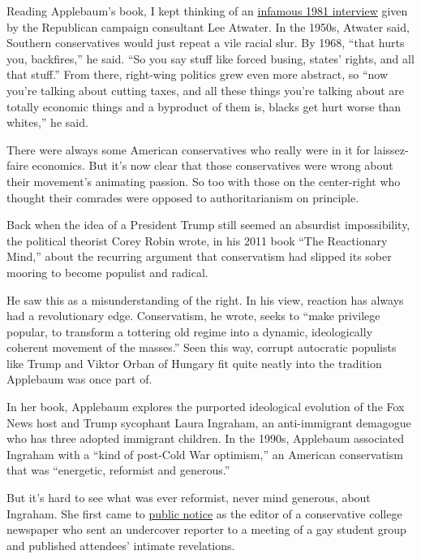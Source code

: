 Reading Applebaum's book, I kept thinking of an
\href{https://www.thenation.com/article/archive/exclusive-lee-atwaters-infamous-1981-interview-southern-strategy/}{infamous
1981 interview} given by the Republican campaign consultant Lee Atwater.
In the 1950s, Atwater said, Southern conservatives would just repeat a
vile racial slur. By 1968, ``that hurts you, backfires,'' he said. ``So
you say stuff like forced busing, states' rights, and all that stuff.''
From there, right-wing politics grew even more abstract, so ``now you're
talking about cutting taxes, and all these things you're talking about
are totally economic things and a byproduct of them is, blacks get hurt
worse than whites,'' he said.

There were always some American conservatives who really were in it for
laissez-faire economics. But it's now clear that those conservatives
were wrong about their movement's animating passion. So too with those
on the center-right who thought their comrades were opposed to
authoritarianism on principle.

Back when the idea of a President Trump still seemed an absurdist
impossibility, the political theorist Corey Robin wrote, in his 2011
book ``The Reactionary Mind,'' about the recurring argument that
conservatism had slipped its sober mooring to become populist and
radical.

He saw this as a misunderstanding of the right. In his view, reaction
has always had a revolutionary edge. Conservatism, he wrote, seeks to
``make privilege popular, to transform a tottering old regime into a
dynamic, ideologically coherent movement of the masses.'' Seen this way,
corrupt autocratic populists like Trump and Viktor Orban of Hungary fit
quite neatly into the tradition Applebaum was once part of.

In her book, Applebaum explores the purported ideological evolution of
the Fox News host and Trump sycophant Laura Ingraham, an anti-immigrant
demagogue who has three adopted immigrant children. In the 1990s,
Applebaum associated Ingraham with a ``kind of post-Cold War optimism,''
an American conservatism that was ``energetic, reformist and generous.''

But it's hard to see what was ever reformist, never mind generous, about
Ingraham. She first came to
\href{https://www.nytimes3xbfgragh.onion/1984/07/16/us/dartmouth-group-privacy-battle-concord-nh-july-15-ap-student-reporter-s-taping.html}{public
notice} as the editor of a conservative college newspaper who sent an
undercover reporter to a meeting of a gay student group and published
attendees' intimate revelations.

